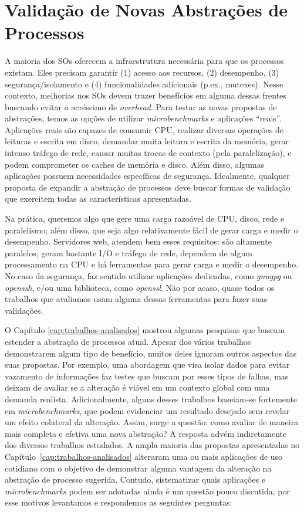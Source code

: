 \chapter{Validação de Novas Abstrações de Processos}
\label{cap:validacoes}

A maioria dos SOs oferecem a infraestrutura necessária para que os processos
existam. Eles precisam garantir (1) acesso aos recursos, (2) desempenho, (3)
segurança/isolamento e (4) funcionalidades adicionais (p.ex., mutexes).  Nesse
contexto, melhorias nos SOs devem trazer benefícios em alguma dessas frentes
buscando evitar o acréscimo de \emph{overhead}. Para testar as novas propostas de
abstrações, temos as opções de utilizar \emph{microbenchmarks} e aplicações
``reais''.  Aplicações reais são capazes de consumir CPU, realizar diversas
operações de leituras e escrita em disco, demandar muita leitura e escrita da
memória, gerar intenso tráfego de rede, causar muitas trocas de contexto (pela
paralelização), e podem comprometer os caches de memória e disco. Além disso,
algumas aplicações possuem necessidades específicas de segurança. Idealmente,
qualquer proposta de expandir a abstração de processos deve buscar formas de
validação que exercitem todas as características apresentadas.

Na prática, queremos algo que gere uma carga razoável de CPU, disco, rede e
paralelismo; além disso, que seja algo relativamente fácil de gerar carga e
medir o desempenho. Servidores web, atendem bem esses requisitos: são altamente
paralelos, geram bastante I/O e tráfego de rede, dependem de algum
processamento na CPU e há ferramentas para gerar carga e medir o desempenho. No
caso da segurança, faz sentido utilizar aplicações dedicadas, como
\emph{gnugpg} ou \emph{openssh}, e/ou uma biblioteca, como \emph{openssl}. Não
por acaso, quase todos os trabalhos que avaliamos usam alguma dessas
ferramentas para fazer suas validações.

O Capítulo \ref{cap:trabalhos-analisados} mostrou algumas pesquisas que buscam
estender a abstração de processos atual. Apesar dos vários trabalhos
demonstrarem algum tipo de benefício, muitos deles ignoram outros aspectos das
suas propostas. Por exemplo, uma abordagem que visa isolar dados para evitar
vazamento de informações faz testes que buscam por esses tipos de falhas, mas
deixam de avaliar se a alteração é viável em um contexto global com uma
demanda realista. Adicionalmente, alguns desses trabalhos baseiam-se
fortemente em \emph{microbenchmarks}, que podem evidenciar um resultado
desejado sem revelar um efeito colateral da alteração. Assim, surge a questão:
como avaliar de maneira mais completa e efetiva uma nova abstração? A resposta
advém indiretamente dos diversos trabalhos estudados. A ampla maioria das
propostas apresentadas no Capítulo~\ref{cap:trabalhos-analisados} alteraram uma
ou mais aplicações de uso cotidiano com o objetivo de demonstrar alguma
vantagem da alteração na abstração de processo sugerida. Contudo, sistematizar
quais aplicações e \emph{microbenchmarks} podem ser adotadas ainda é um questão
pouco discutida; por esse motivos levantamos e respondemos as seguintes
perguntas:

